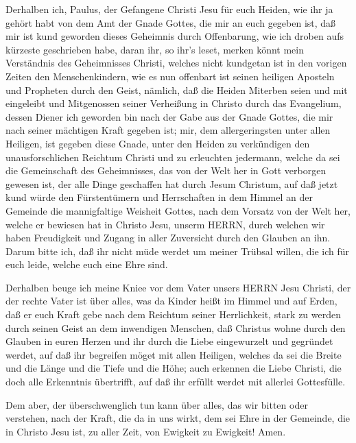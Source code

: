  Derhalben ich, Paulus, der Gefangene Christi Jesu für euch
Heiden,  wie ihr ja gehört habt von dem Amt der Gnade
Gottes, die mir an euch gegeben ist,  daß mir ist kund
geworden dieses Geheimnis durch Offenbarung, wie ich droben aufs
kürzeste geschrieben habe,  daran ihr, so ihr's leset,
merken könnt mein Verständnis des Geheimnisses Christi, 
welches nicht kundgetan ist in den vorigen Zeiten den Menschenkindern,
wie es nun offenbart ist seinen heiligen Aposteln und Propheten durch
den Geist,  nämlich, daß die Heiden Miterben seien und mit
eingeleibt und Mitgenossen seiner Verheißung in Christo durch das
Evangelium,  dessen Diener ich geworden bin nach der Gabe
aus der Gnade Gottes, die mir nach seiner mächtigen Kraft gegeben ist;
 mir, dem allergeringsten unter allen Heiligen, ist gegeben
diese Gnade, unter den Heiden zu verkündigen den unausforschlichen
Reichtum Christi  und zu erleuchten jedermann, welche da sei
die Gemeinschaft des Geheimnisses, das von der Welt her in Gott
verborgen gewesen ist, der alle Dinge geschaffen hat durch Jesum
Christum,  auf daß jetzt kund würde den Fürstentümern und
Herrschaften in dem Himmel an der Gemeinde die mannigfaltige Weisheit
Gottes,  nach dem Vorsatz von der Welt her, welche er
bewiesen hat in Christo Jesu, unserm HERRN,  durch welchen
wir haben Freudigkeit und Zugang in aller Zuversicht durch den Glauben
an ihn.  Darum bitte ich, daß ihr nicht müde werdet um
meiner Trübsal willen, die ich für euch leide, welche euch eine Ehre
sind.

 Derhalben beuge ich meine Kniee vor dem Vater unsers HERRN
Jesu Christi,  der der rechte Vater ist über alles, was da
Kinder heißt im Himmel und auf Erden,  daß er euch Kraft
gebe nach dem Reichtum seiner Herrlichkeit, stark zu werden durch seinen
Geist an dem inwendigen Menschen,  daß Christus wohne durch
den Glauben in euren Herzen und ihr durch die Liebe eingewurzelt und
gegründet werdet,  auf daß ihr begreifen möget mit allen
Heiligen, welches da sei die Breite und die Länge und die Tiefe und die
Höhe;  auch erkennen die Liebe Christi, die doch alle
Erkenntnis übertrifft, auf daß ihr erfüllt werdet mit allerlei
Gottesfülle.

 Dem aber, der überschwenglich tun kann über alles, das wir
bitten oder verstehen, nach der Kraft, die da in uns wirkt,
 dem sei Ehre in der Gemeinde, die in Christo Jesu ist, zu
aller Zeit, von Ewigkeit zu Ewigkeit! Amen.

